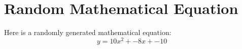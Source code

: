 \documentclass{article}
\begin{document}
\section*{Random Mathematical Equation}
Here is a randomly generated mathematical equation:
\[ y = 10x^2 + -8x + -10 \]
\end{document}
